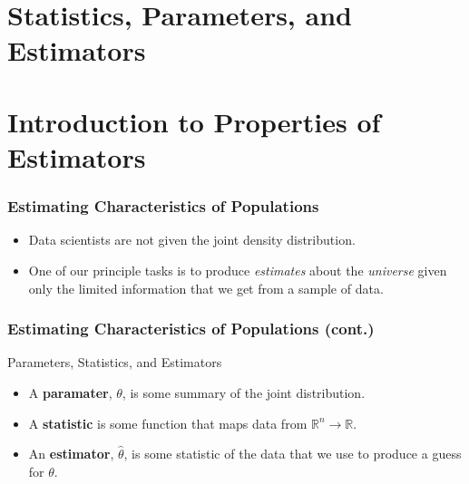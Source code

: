 \documentclass[12pt, block=fill]{beamer}
\newcommand{\R}{\mathbb{R}}
\begin{document}
\section{Statistics, Parameters, and Estimators} 

\section{Introduction to Properties of Estimators} 

\begin{frame}
  \frametitle{Estimating Characteristics of Populations}
  \begin{itemize}
  \item Data scientists are not given the joint density distribution.
  \item One of our principle tasks is to produce \textit{estimates}
    about the \textit{universe} given only the limited information
    that we get from a sample of data.
  \end{itemize}
\end{frame}

\begin{frame}[t]
  \frametitle{Estimating Characteristics of Populations (cont.)}
  \begin{block}{Parameters, Statistics, and Estimators}
    \begin{itemize}
    \item A \textbf{paramater}, $\theta$, is some summary of the joint
      distribution.
    \item A \textbf{statistic} is some function that maps data from
      $\R^{n} \to \R$. 
    \item An \textbf{estimator}, $\hat{\theta}$, is some statistic of the
      data that we use to produce a guess for $\theta$.
    \end{itemize}
  \end{block}
\end{frame}
\end{document}
